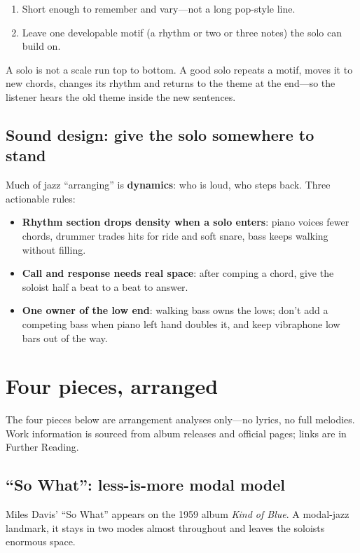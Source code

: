 \begin{enumerate}
\item Short enough to remember and vary---not a long pop-style line.
\item Leave one developable motif (a rhythm or two or three notes) the solo can build on.
\end{enumerate}

A solo is not a scale run top to bottom. A good solo repeats a motif, moves it to new chords, changes its rhythm and returns to the theme at the end---so the listener hears the old theme inside the new sentences.

\subsection{Sound design: give the solo somewhere to stand}
\label{sec:jazz-sound}

Much of jazz ``arranging'' is \textbf{dynamics}: who is loud, who steps back. Three actionable rules:

\begin{itemize}
\item \textbf{Rhythm section drops density when a solo enters}: piano voices fewer chords, drummer trades hits for ride and soft snare, bass keeps walking without filling.
\item \textbf{Call and response needs real space}: after comping a chord, give the soloist half a beat to a beat to answer.
\item \textbf{One owner of the low end}: walking bass owns the lows; don't add a competing bass when piano left hand doubles it, and keep vibraphone low bars out of the way.
\end{itemize}

\section{Four pieces, arranged}
\label{sec:jazz-cases}

The four pieces below are arrangement analyses only---no lyrics, no full melodies. Work information is sourced from album releases and official pages; links are in Further Reading.

\subsection{``So What'': less-is-more modal model}
\label{sec:jazz-case-so-what}

Miles Davis' ``So What'' appears on the 1959 album \emph{Kind of Blue}. A modal-jazz landmark, it stays in two modes almost throughout and leaves the soloists enormous space.

